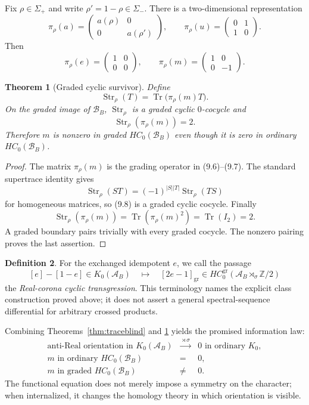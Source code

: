 \documentclass[11pt]{article}
\newtheorem{theorem}{Theorem}[section]
\theoremstyle{definition}
\newtheorem{definition}[theorem]{Definition}
\theoremstyle{remark}
\newcommand{\Z}{\mathbb Z}
\newcommand{\A}{\mathcal A}
\newcommand{\B}{\mathcal B}
\newcommand{\Str}{\operatorname{Str}}
\newcommand{\Tr}{\operatorname{Tr}}
\begin{document}
Fix $\rho\in\Sigma_+$ and write $\rho'=1-\rho\in\Sigma_-$.  There is a
two-dimensional representation
\[
 \pi_\rho(a)=
 \begin{pmatrix}a(\rho)&0\\0&a(\rho')\end{pmatrix},
 \qquad
 \pi_\rho(u)=
 \begin{pmatrix}0&1\\1&0\end{pmatrix}.              \tag{9.6}
\]
Then
\[
 \pi_\rho(e)=
 \begin{pmatrix}1&0\\0&0\end{pmatrix},
 \qquad
 \pi_\rho(m)=
 \begin{pmatrix}1&0\\0&-1\end{pmatrix}.             \tag{9.7}
\]

\begin{theorem}[Graded cyclic survivor]\label{thm:graded}
Define
\[
          \Str_\rho(T)=\Tr\bigl(\pi_\rho(m)T\bigr).  \tag{9.8}
\]
On the graded image of $\B_B$, $\Str_\rho$ is a graded cyclic $0$-cocycle and
\[
                       \Str_\rho(\pi_\rho(m))=2.      \tag{9.9}
\]
Therefore $m$ is nonzero in graded $HC_0(\B_B)$ even though it is zero in
ordinary $HC_0(\B_B)$.
\end{theorem}

\begin{proof}
The matrix $\pi_\rho(m)$ is the grading operator in (9.6)--(9.7).  The standard
supertrace identity gives
\[
 \Str_\rho(ST)=(-1)^{|S||T|}\Str_\rho(TS)
\]
for homogeneous matrices, so (9.8) is a graded cyclic cocycle.  Finally
\[
 \Str_\rho(\pi_\rho(m))
 =\Tr(\pi_\rho(m)^2)=\Tr(I_2)=2.
\]
A graded boundary pairs trivially with every graded cocycle.  The nonzero
pairing proves the last assertion.
\end{proof}

\begin{definition}
For the exchanged idempotent $e$, we call the passage
\[
 [e]-[1-e]\in K_0(\A_B)
 \quad\longmapsto\quad
 [2e-1]_{\mathrm{gr}}\in HC^{\mathrm{gr}}_0(\A_B\rtimes_\sigma\Z/2)
                                                               \tag{9.10}
\]
the \emph{Real-corona cyclic transgression}.  This terminology names the
explicit class construction proved above; it does not assert a general
spectral-sequence differential for arbitrary crossed products.
\end{definition}

Combining Theorems~\ref{thm:traceblind} and \ref{thm:graded} yields the promised
information law:
\[
\begin{array}{ccl}
\text{anti-Real orientation in }K_0(\A_B)
 &\xrightarrow{\ \rtimes\sigma\ }&0\text{ in ordinary }K_0,\\[1mm]
m\text{ in ordinary }HC_0(\B_B)
 &=&0,\\[1mm]
m\text{ in graded }HC_0(\B_B)
 &\ne&0.
\end{array}                                             \tag{9.11}
\]
The functional equation does not merely impose a symmetry on the character;
when internalized, it changes the homology theory in which orientation is
visible.
\end{document}

